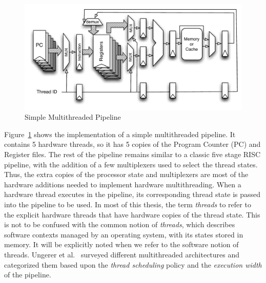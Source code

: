 \begin{figure}[h]
\begin{center}
\includegraphics[scale=.8]{figs/multithreaded_pipeline_block}
\end{center}
\vspace{-10pt}
\caption{Simple Multithreaded Pipeline}
\label{fig:multi-thread pipeline simplified}
\end{figure}
Figure~\ref{fig:multi-thread pipeline simplified} shows the implementation of a simple multithreaded pipeline.
It contains 5 hardware threads, so it has 5 copies of the Program Counter (PC) and Register files.
The rest of the pipeline remains similar to a classic five stage RISC pipeline, with the addition of a few multiplexers used to select the thread states.
Thus, the extra copies of the processor state and multiplexers are most of the hardware additions needed to implement hardware multithreading.
When a hardware thread executes in the pipeline, its corresponding thread state is passed into the pipeline to be used.
In most of this thesis, the term \emph{threads} to refer to the explicit hardware threads that have hardware copies of the thread state.
This is not to be confused with the common notion of \emph{threads}, which describes software contexts managed by an operating system, with its states stored in memory.
It will be explicitly noted when we refer to the software notion of threads. 
Ungerer et al.~\cite{Ungerer:2003:survey_multithreading} surveyed different multithreaded architectures and categorized them based upon the \emph{thread scheduling} policy and the \emph{execution width} of the pipeline.

